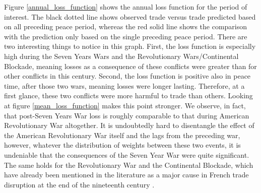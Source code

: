 \documentclass[12pt,a4paper,notitlepage,english]{article}
\begin{document}
Figure \ref{annual_loss_function} shows the annual loss function for the period of interest. The black dotted line shows observed trade versus trade predicted based on all preceding peace period, whereas the red solid line shows the comparison with the prediction only based on the single preceding peace period. There are two interesting things to notice in this graph. First, the loss function is especially high during the Seven Years Wars and the Revolutionary Wars/Continental Blockade, meaning losses as a consequence of these conflicts were greater than for other conflicts in this century. Second, the loss function is positive also in peace time, after those two wars, meaning losses were longer lasting. Therefore, at a first glance, these two conflicts were more harmful to trade than others. Looking at figure \ref{mean_loss_function} makes this point stronger. We observe, in fact, that post-Seven Years War loss is roughly comparable to that during American Revolutionary War altogether. It is undoubtedly hard to disentangle the effect of the American Revolutionary War itself and the lags from the preceding war, however, whatever the distribution of weights between these two events, it is undeniable that the consequences of the Seven Year War were quite significant. The same holds for the Revolutionary War and the Continental Blockade, which have already been mentioned in the literature as a major cause in French trade disruption at the end of the nineteenth century \citep{o2005worldwide}.
\end{document}

